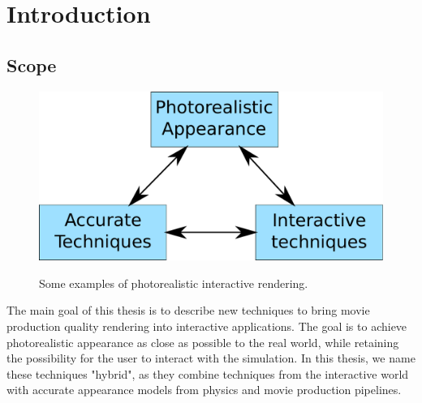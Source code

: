 \chapter{Introduction}



\label{sec:intro}
\section{Scope}

\begin{figure}
\centering
	 \includegraphics[draft,width=\textwidth]{figures/main_diagram}  \\
\caption{Some examples of photorealistic interactive rendering.} 
\label{fig:main_examples}
\end{figure}


The main goal of this thesis is to describe new techniques to bring movie production quality rendering into interactive applications.  The goal is to achieve photorealistic appearance as close as possible to the real world, while retaining the possibility for the user to interact with the simulation. In this thesis, we name these techniques "hybrid", as they combine techniques from the interactive world with accurate appearance models from physics and movie production pipelines.

